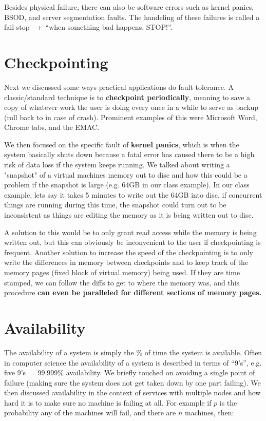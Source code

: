 \documentclass[twoside]{article}
\begin{document}
Besides physical failure, there can also be software errors such as kernel panics, BSOD, and server segmentation faults. The handeling of these failures is called a fail-stop $\rightarrow$ ``when something bad happens, STOP!''.

\section{Checkpointing}

Next we discussed some ways practical applications do fault tolerance. A classic/standard technique is to \textbf{checkpoint periodically}, meaning to save a copy of whatever work the user is doing every once in a while to serve as backup (roll back to in case of crash). Prominent examples of this were Microsoft Word, Chrome tabs, and the EMAC.

We then focused on the specific fault of \textbf{kernel panics}, which is when the system basically shuts down because a fatal error has caused there to be a high risk of data loss if the system keeps running. We talked about writing a "snapshot" of a virtual machines memory out to disc and how this could be a problem if the snapshot is large (e.g. 64GB in our class example). In our class example, lets say it takes 5 minutes to write out the 64GB into disc, if concurrent things are running during this time, the snapshot could turn out to be inconsistent as things are editing the memory as it is being written out to disc.

A solution to this would be to only grant read access while the memory is being written out, but this can obviously be inconvenient to the user if checkpointing is frequent. Another solution to increase the speed of the checkpointing is to only write the differences in memory between checkpoints and to keep track of the memory pages (fixed block of virtual memory) being used. If they are time stamped, we can follow the diffs to get to where the memory was, and this procedure \textbf{can even be paralleled for different sections of memory pages.}

\section{Availability}

The availability of a system is simply the $\%$ of time the system is available. Often in computer science the availability of a system is described in terms of ``9's'', e.g. five 9's $=99.999\%$ availability. We briefly touched on avoiding a single point of failure (making sure the system does not get taken down by one part failing). We then discussed availability in the context of services with multiple nodes and how hard it is to make sure no machine is failing at all. For example if $p$ is the probability any of the machines will fail, and there are $n$ machines, then:
\end{document}
